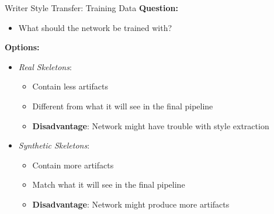 \documentclass[aspectratio=169]{beamer}
\begin{document}
\begin{frame}{Writer Style Transfer: Training Data}
\textbf{Question:}
\begin{itemize}
\item What should the network be trained with?
\end{itemize}

\vspace{1em}
\textbf{Options:}
\begin{itemize}
\item \emph{Real Skeletons}:
\begin{itemize}
\item Contain less artifacts
\item Different from what it will see in the final pipeline
\item \textbf{Disadvantage}: Network might have trouble with style extraction
\end{itemize}

\item \emph{Synthetic Skeletons}:
\begin{itemize}
\item Contain more artifacts
\item Match what it will see in the final pipeline
\item \textbf{Disadvantage}: Network might produce more artifacts
\end{itemize}
\end{itemize}

\end{frame}
\end{document}
